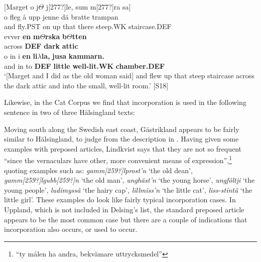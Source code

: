 
\ea\label{}
{}[Marget o j$\Theta $ j[277?]le, sum m[277?]ra sa]\\
\gll o  fleg  å  upp  jenne  dä  bratte  trampan\\
and  fly.PST  on  up  that  there  steep.WK  staircase.DEF\\
\gll evver  \textbf{en} \textbf{m}\textbf{$\Theta $}\textbf{rska} \textbf{b}\textbf{$\Theta $}\textbf{tten}\\
across  \textbf{DEF} \textbf{dark} \textbf{attic}\\
\gll o  in  i  \textbf{en}\textbf{  li}\textbf{$\lambda $}\textbf{la,}\textbf{  jusa}\textbf{  kammarn.}\\
and  in  to   \textbf{DEF} \textbf{little} \textbf{well-lit.WK} \textbf{chamber.DEF}\\
\glt ‘[Marget and I did as the old woman said] and flew up that steep staircase across the dark attic and into the small, well-lit room.’ [S18]
\z

Likewise, in the Cat Corpus we find that incorporation is used in the following sentence in two of three Hälsingland texts:


\ea
{}
\z 
\z 

Moving south along the Swedish east coast, Gästrikland appears to be fairly similar to Hälsingland, to judge from the description in \citet[79]{Lindkvist1942}.  Having given some examples with preposed articles, Lindkvist says that they are not so frequent “since the vernaculars have other, more convenient means of expression”,\footnote{ “ty målen ha andra, bekvämare uttrycksmedel”} quoting examples such as: \textit{gamm[259?]lprost’n} ‘the old dean’, \textit{gamm[259?]lgubb[259?]n} ‘the old man’, \textit{unghäst’n} ‘the young horse’, \textit{ungfôltji} ‘the young people’, \textit{ludimyssâ} ‘the hairy cap’, \textit{lillmiss’n} ‘the little cat’, \textit{liss-stintâ} ‘the little girl’. These examples do look like fairly typical incorporation cases.  In Uppland, which is not included in Delsing’s list, the standard preposed article appears to be the most common case but there are a couple of indications that incorporation also occurs, or used to occur.

